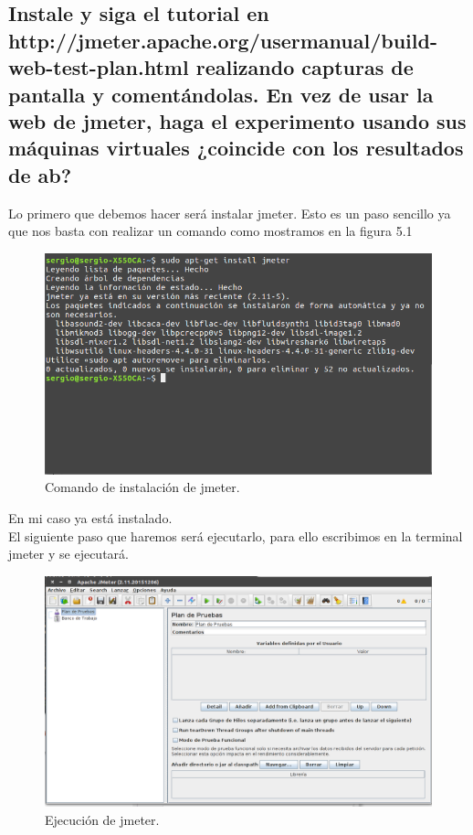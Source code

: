 \subsection{\Large Instale y siga el tutorial en http://jmeter.apache.org/usermanual/build-web-test-plan.html realizando capturas de pantalla y comentándolas. En vez de usar la web de jmeter, haga el experimento usando sus máquinas virtuales ¿coincide con los resultados de ab?}

Lo primero que debemos hacer será instalar jmeter.
Esto es un paso sencillo ya que nos basta con realizar un comando como mostramos en la figura 5.1

\begin{figure}[H] %
	\centering
	\includegraphics[scale=0.5]{imagenes/install-jmeter.png}  %
	\caption{Comando de instalación de jmeter.}
\end{figure}

En mi caso ya está instalado.
\\El siguiente paso que haremos será ejecutarlo, para ello escribimos en la terminal jmeter y se ejecutará.

\begin{figure}[H] %
	\centering
	\includegraphics[scale=0.35]{imagenes/jmeter-1.png}  %
	\caption{Ejecución de jmeter.}
\end{figure}

